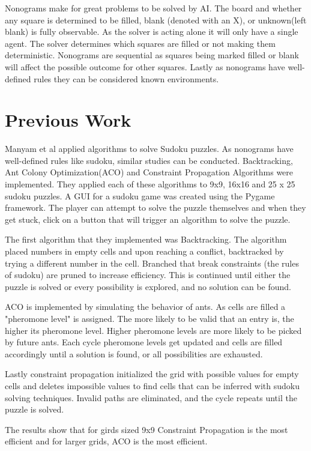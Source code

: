 \documentclass[12pt, letterpaper]{article}
\begin{document}
    Nonograms make for great problems to be solved by AI. The board and whether any square is determined to be filled, blank (denoted with an X), or unknown(left blank) is fully observable. As the solver is acting alone it will only have a single agent. The solver determines which squares are filled or not making them deterministic. Nonograms are sequential as squares being marked filled or blank will affect the possible outcome for other squares. Lastly as nonograms have well-defined rules they can be considered known environments.


\section{Previous Work}
    Manyam et al \cite{10863160} applied algorithms to solve Sudoku puzzles. As nonograms have well-defined rules like sudoku, similar studies can be conducted. Backtracking, Ant Colony Optimization(ACO) and Constraint Propagation Algorithms were implemented. They applied each of these algorithms to 9x9, 16x16 and 25 x 25 sudoku puzzles. A GUI for a sudoku game was created using the Pygame framework. The player can attempt to solve the puzzle themselves and when they get stuck, click on a button that will trigger an algorithm to solve the puzzle.

    The first algorithm that they implemented was Backtracking. The algorithm placed numbers in empty cells and upon reaching a conflict, backtracked by trying a different number in the cell. Branched that break constraints (the rules of sudoku) are pruned to increase efficiency. This is continued until either the puzzle is solved or every possibility is explored, and no solution can be found.

    ACO is implemented by simulating the behavior of ants. As cells are filled a "pheromone level" is assigned. The more likely to be valid that an entry is, the higher its pheromone level. Higher pheromone levels are more likely to be picked by future ants. Each cycle pheromone levels get updated and cells are filled accordingly until a solution is found, or all possibilities are exhausted.

    Lastly constraint propagation initialized the grid with possible values for empty cells and deletes impossible values to find cells that can be inferred with sudoku solving techniques. Invalid paths are eliminated, and the cycle repeats until the puzzle is solved.

    The results show that for girds sized 9x9 Constraint Propagation is the most efficient and for larger grids, ACO is the most efficient.
\end{document}

